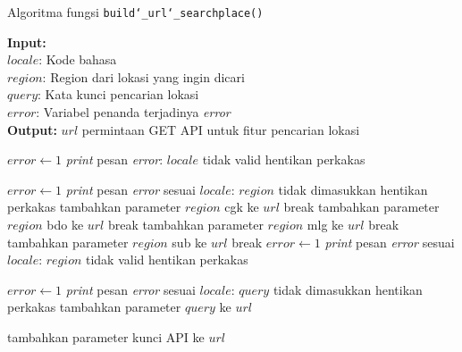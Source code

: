 \begin{algorithm}[h]
	\caption{\textendash\xspace Algoritma fungsi \texttt{build\char`_url\char`_searchplace()}}
	\label{alg:design-buildurl-searchplace}
	\vspace{-0.6\baselineskip}
	\begin{flushleft}
        \textbf{Input:} \\
        \hspace{1.1em}\textendash\xspace $locale$: Kode bahasa \\
        \hspace{1.1em}\textendash\xspace $region$: Region dari lokasi yang ingin dicari \\
        \hspace{1.1em}\textendash\xspace $query$: Kata kunci pencarian lokasi \\
        \hspace{1.1em}\textendash\xspace $error$: Variabel penanda terjadinya \textit{error} \\
        \textbf{Output:} $url$ permintaan GET API untuk fitur pencarian lokasi \\
	\end{flushleft}
	\vspace{-1.05\baselineskip}
	\begin{algorithmic}
		    \State $error \gets 1$
			\State \textit{print} pesan \textit{error}: $locale$ tidak valid
			\State hentikan perkakas
		\EndIf
		
				\State $error \gets 1$
				\State \textit{print} pesan \textit{error} sesuai $locale$: $region$ tidak dimasukkan
				\State hentikan perkakas
			\EndCase
				\State tambahkan parameter $region$ \textquotesingle\textquotesingle cgk\textquotesingle\textquotesingle\xspace ke $url$
				\State break
			\EndCase
				\State tambahkan parameter $region$ \textquotesingle\textquotesingle bdo\textquotesingle\textquotesingle\xspace ke $url$
				\State break
			\EndCase
				\State tambahkan parameter $region$ \textquotesingle\textquotesingle mlg\textquotesingle\textquotesingle\xspace ke $url$
				\State break
			\EndCase
				\State tambahkan parameter $region$ \textquotesingle\textquotesingle sub\textquotesingle\textquotesingle\xspace ke $url$
				\State break
			\EndCase
			\Default
				\State $error \gets 1$
				\State \textit{print} pesan \textit{error} sesuai $locale$: $region$ tidak valid
				\State hentikan perkakas
			\EndDefault
		\EndSwitch
		
		    \State $error \gets 1$
			\State \textit{print} pesan \textit{error} sesuai $locale$: $query$ tidak dimasukkan
			\State hentikan perkakas
		\Else
			\State tambahkan parameter $query$ ke $url$
		\EndIf
		
		\State tambahkan parameter kunci API ke $url$
		
		\State {}
	\end{algorithmic}
\end{algorithm}

